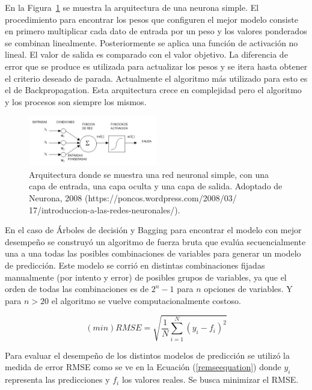 \documentclass[a4paper,12pt,twocolumn]{article}
\begin{document}
En la Figura~\ref{redNeuronal} se muestra la arquitectura de una neurona simple. El procedimiento para encontrar los pesos que configuren el mejor modelo consiste en primero multiplicar cada dato de entrada por un peso y los valores ponderados se combinan linealmente. Posteriormente se aplica una función de activación no lineal. El valor de salida es comparado con el valor objetivo. La diferencia de error que se produce es utilizada para actualizar los pesos y se itera hasta obtener el criterio deseado de parada. Actualmente el algoritmo más utilizado para esto es el de Backpropagation.  Esta arquitectura crece en complejidad pero el algoritmo y los procesos son siempre los mismos. 

\begin{figure}[!hbt]
\centering
\includegraphics[width=0.5\textwidth]{redNeuronal}
\caption{Arquitectura donde se muestra una red neuronal simple, con una capa de entrada, una capa oculta y una capa de salida. Adoptado de Neurona, 2008 (https://poncos.wordpress.com/2008/03/
17/introduccion-a-las-redes-neuronales/).}
\label{redNeuronal}
\end{figure}

En el caso de Árboles de decisión y Bagging para encontrar el modelo con mejor  desempeño se construyó un algoritmo de fuerza bruta que evalúa secuencialmente una a una todas las posibles combinaciones de variables para generar un modelo de predicción. Este modelo se corrió en distintas combinaciones fijadas manualmente (por intento y error) de posibles grupos de variables, ya que el orden de todas las combinaciones es de $2^n - 1$ para $n$ opciones de variables. Y para $n>20$ el algoritmo se vuelve computacionalmente costoso.

\begin{equation}
(min)RMSE=\sqrt{\frac{1}{N} \sum_{i=1}^{N}\left(y_{i}-f_{i}\right)^{2}}
\label{remseequation}
\end{equation}

Para evaluar el desempeño de los distintos modelos de predicción se utilizó la medida de error RMSE como se ve en la Ecuación (\ref{remseequation}) donde $y_i$ representa las predicciones y $f_i$ los valores reales. Se busca minimizar el RMSE.
\end{document}

